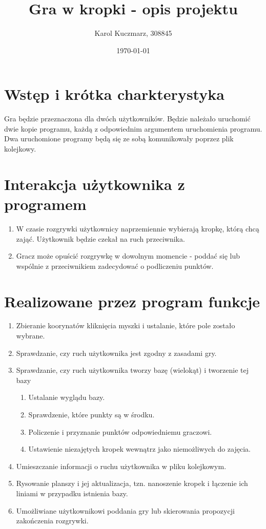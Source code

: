 \documentclass[a4paper]{article}
\author{Karol Kuczmarz, 308845}
\title{Gra w kropki - opis projektu}
\date{\today}
\begin{document}
\maketitle
\section{Wstęp i krótka charkterystyka}
Gra będzie przeznaczona dla dwóch użytkowników. Będzie należało uruchomić dwie kopie programu, każdą z odpowiednim argumentem uruchomienia programu.  Dwa uruchomione programy będą się ze sobą komunikowały poprzez plik kolejkowy.
\section{Interakcja użytkownika z programem}
\begin{enumerate}
\item W czasie rozgrywki użytkownicy naprzemiennie wybierają kropkę, którą chcą zająć. Użytkownik będzie czekał na ruch przeciwnika.
\item Gracz może opuścić rozgrywkę w dowolnym momencie - poddać się lub wspólnie z przeciwnikiem zadecydować o podliczeniu punktów.
\end{enumerate}
\section{Realizowane przez program funkcje}
\begin{enumerate}
\item Zbieranie koorynatów kliknięcia myszki i ustalanie, które pole zostało wybrane.
\item Sprawdzanie, czy ruch użytkownika jest zgodny z zasadami gry.
\item Sprawdzanie, czy ruch użytkownika tworzy bazę (wielokąt) i tworzenie tej bazy
\begin{enumerate}
\item Ustalanie wyglądu bazy.
\item Sprawdzenie, które punkty są w środku.
\item Policzenie i przyznanie punktów odpowiedniemu graczowi.
\item Ustawienie niezajętych kropek wewnątrz jako niemożliwych do zajęcia. 
\end{enumerate}
\item Umieszczanie informacji o ruchu użytkownika w pliku kolejkowym.
\item Rysowanie planszy i jej aktualizacja, tzn. nanoszenie kropek i łączenie ich liniami w przypadku istnienia bazy.
\item Umożliwiane użytkownikowi poddania gry lub skierowania propozycji zakończenia rozgrywki. 
\end{enumerate}
\end{document}
